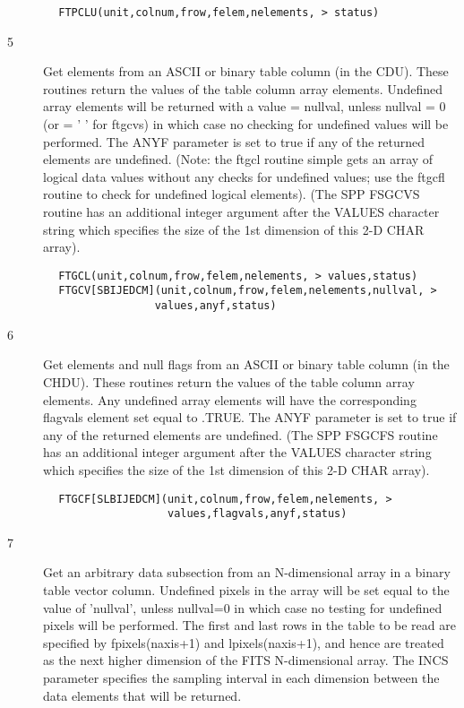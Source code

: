\documentclass[11pt]{book}
\begin{document}
\begin{verbatim}
        FTPCLU(unit,colnum,frow,felem,nelements, > status)
\end{verbatim}

\begin{description}
\item[5 ] Get elements from an ASCII or binary table column (in the CDU).  These
    routines return the values of the table column array elements.  Undefined
    array elements will be returned with a value = nullval, unless nullval = 0
    (or = ' ' for ftgcvs) in which case no checking for undefined values will
    be performed. The ANYF parameter is set to true if any of the returned
    elements are undefined. (Note: the ftgcl routine simple gets an array
    of logical data values without any checks for undefined values;  use
    the ftgcfl routine to check for undefined logical elements).
    (The SPP FSGCVS routine has an additional integer argument after
    the VALUES character string which specifies the size of the 1st
   dimension of this 2-D CHAR array).
\end{description}

\begin{verbatim}
        FTGCL(unit,colnum,frow,felem,nelements, > values,status)
        FTGCV[SBIJEDCM](unit,colnum,frow,felem,nelements,nullval, >
                       values,anyf,status)
\end{verbatim}

\begin{description}
\item[6 ] Get elements and null flags from an ASCII or binary table column (in the
    CHDU).  These routines return the values of the table column array elements.
    Any undefined array elements will have the corresponding flagvals element
    set equal to .TRUE. The ANYF parameter is set to true if any of the
    returned elements are undefined.
    (The SPP FSGCFS routine has an additional integer argument after
    the VALUES character string which specifies the size of the 1st
   dimension of this 2-D CHAR array).
\end{description}

\begin{verbatim}
        FTGCF[SLBIJEDCM](unit,colnum,frow,felem,nelements, >
                         values,flagvals,anyf,status)
\end{verbatim}

\begin{description}
\item[7 ] Get an arbitrary data subsection from an N-dimensional array
    in a binary table vector column.  Undefined pixels
    in the array will be set equal to the value of 'nullval',
    unless nullval=0 in which case no testing for undefined pixels will
    be performed.  The first and last rows in the table to be read
    are specified by fpixels(naxis+1) and lpixels(naxis+1), and hence
    are treated as the next higher dimension of the FITS N-dimensional
    array.  The INCS parameter specifies the sampling interval in
   each dimension between the data elements that will be returned.
\end{description}
\end{document}
